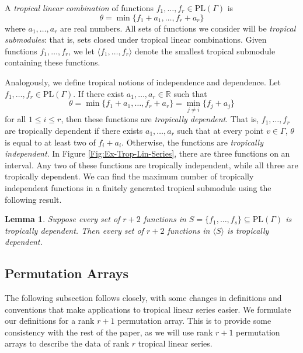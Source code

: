 \documentclass{amsart}
\newtheorem{lemma}[theorem]{Lemma}
\begin{document}
	A \textit{tropical linear combination} of functions $f_1, \ldots, f_r \in \mathrm{PL}(\Gamma)$ is $$\theta = \min \{ f_1 + a_1, \ldots , f_r + a_r \}$$ where $a_1, \ldots, a_r$ are real numbers. All sets of functions we consider will be \textit{tropical submodules}: that is, sets closed under tropical linear combinations. Given functions $f_1, \ldots, f_r$, we let $\langle f_1, \ldots, f_r \rangle$ denote the smallest tropical submodule containing these functions.
	
	Analogously, we define tropical notions of independence and dependence. Let $f_1, \ldots, f_r \in \mathrm{PL}(\Gamma)$. If there exist $a_1, \ldots, a_r \in \mathbb{R}$ such that $$\theta = \min\{ f_1 + a_1, \ldots , f_r + a_r \} = \min_{j \neq i} \{ f_j + a_j \}$$ for all $1 \leq i \leq r$, then these functions are \textit{tropically dependent}. That is, $f_1, \ldots, f_r$ are tropically dependent if there exists $a_1, \ldots, a_r$ such that at every point $v \in \Gamma$, $\theta$ is equal to at least two of $f_i + a_i$. Otherwise, the functions are \textit{tropically independent}. In Figure \ref{Fig:Ex-Trop-Lin-Series}, there are three functions on an interval. Any two of these functions are tropically independent, while all three are tropically dependent. We can find the maximum number of tropically independent functions in a finitely generated tropical submodule using the following result.
	
	\begin{lemma}\cite[Lemma~3.2]{chang2025matroidal}
		\label{Lem:generators-determine-dependence}
		Suppose every set of $r+2$ functions in $S = \{ f_1, \ldots, f_s \} \subseteq \mathrm{PL}(\Gamma)$ is tropically dependent. Then every set of $r+2$ functions in $\langle S \rangle$ is tropically dependent.
	\end{lemma}
	
	\subsection{Permutation Arrays}
	\label{Subsec:Permutation-Arrays}
	
	The following subsection follows \cite{eriksson2000combinatorial} closely, with some changes in definitions and conventions that make applications to tropical linear series easier. We formulate our definitions for a rank $r+1$ permutation array. This is to provide some consistency with the rest of the paper, as we will use rank $r+1$ permutation arrays to describe the data of rank $r$ tropical linear series.
	
\end{document}
